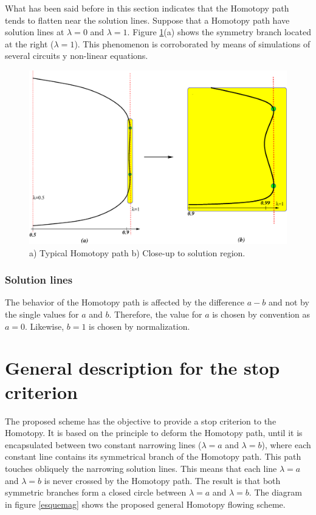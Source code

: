 \documentclass[conference,letterpaper,onecolumn]{IEEEtran}
\begin{document}
What has been said before in this section indicates that the Homotopy path tends to flatten near the solution lines. Suppose that a Homotopy path have solution lines at $\lambda=0$ and $\lambda=1$. Figure \ref{xxx1}(a) shows the symmetry branch located at the right ($\lambda=1$). This phenomenon is corroborated by means of simulations of several circuits y non-linear equations.

\begin{figure}[hbtp]
\centering
\includegraphics[scale=0.45]{figs/curvatura.eps}
\caption{a) Typical Homotopy path b) Close-up to solution region.}
\label{xxx1}
\end{figure}

\subsubsection{Solution lines}

The behavior of the Homotopy path is affected by the difference $a-b$ and not by the single values for $a$ and $b$. Therefore, the value for $a$ is chosen by convention as $a=0$. Likewise, $b=1$ is chosen by normalization.

\section{General description for the stop criterion}

The proposed scheme has the objective to provide a stop criterion to the Homotopy. It is based on the principle to deform the Homotopy path, until it is encapsulated between two constant narrowing lines ($\lambda=a$ and $\lambda=b$), where each constant line contains its symmetrical branch of the Homotopy path. This path touches obliquely the narrowing solution lines. This means that each line $\lambda=a$ and $\lambda=b$ is never crossed by the Homotopy path. The result is that both symmetric branches form a closed circle between $\lambda=a$ and $\lambda=b$. The diagram in figure \ref{esquemag} shows the proposed  general Homotopy flowing scheme.
\end{document}

